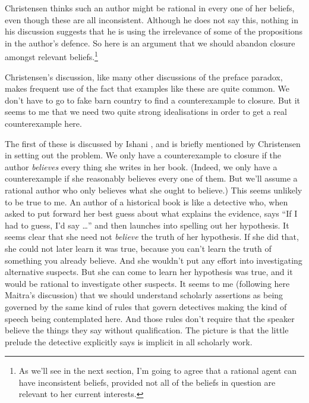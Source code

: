 \noindent Christensen thinks such an author might be rational in every one of her beliefs, even though these are all inconsistent. Although he does not say this, nothing in his discussion suggests that he is using the irrelevance of some of the propositions in the author's defence. So here is an argument that we should abandon closure amongst relevant beliefs.\footnote{As we'll see in the next section, I'm going to agree that a rational agent can have inconsistent beliefs, provided not all of the beliefs in question are relevant to her current interests.}

Christensen's discussion, like many other discussions of the preface paradox, makes frequent use of the fact that examples like these are quite common. We don't have to go to fake barn country to find a counterexample to closure. But it seems to me that we need two quite strong idealisations in order to get a real counterexample here.

The first of these is discussed by Ishani \cite{MaitraANG}, and is briefly mentioned by Christensen in setting out the problem. We only have a counterexample to closure if the author \textit{believes} every thing she writes in her book. (Indeed, we only have a counterexample if she reasonably believes every one of them. But we'll assume a rational author who only believes what she ought to believe.) This seems unlikely to be true to me. An author of a historical book is like a detective who, when asked to put forward her best guess about what explains the evidence, says ``If I had to guess, I'd say {\dots}'' and then launches into spelling out her hypothesis. It seems clear that she need not \textit{believe} the truth of her hypothesis. If she did that, she could not later learn it was true, because you can't learn the truth of something you already believe. And she wouldn't put any effort into investigating alternative suspects. But she can come to learn her hypothesis was true, and it would be rational to investigate other suspects. It seems to me (following here Maitra's discussion) that we should understand scholarly assertions as being governed by the same kind of rules that govern detectives making the kind of speech being contemplated here. And those rules don't require that the speaker believe the things they say without qualification. The picture is that the little prelude the detective explicitly says is implicit in all scholarly work.

